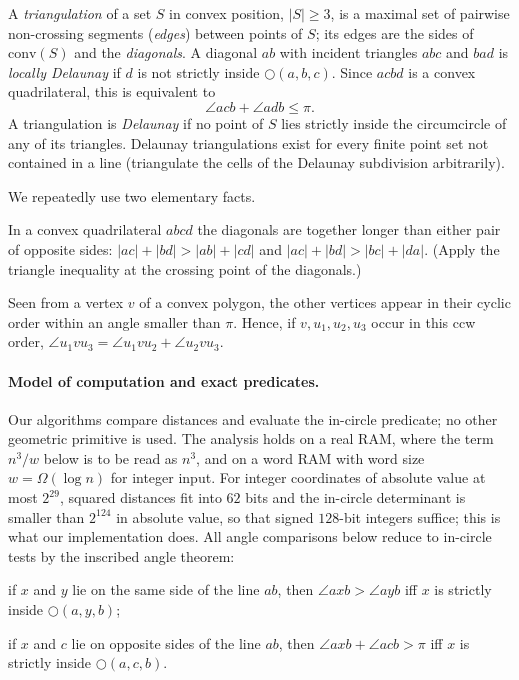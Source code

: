 \documentclass[11pt,a4paper]{article}
\theoremstyle{definition}
\theoremstyle{remark}
\newcommand{\conv}{\mathrm{conv}}
\newcommand{\ang}{\angle}
\newcommand{\circlethree}[3]{\bigcirc(#1,#2,#3)}
\begin{document}
A \emph{triangulation} of a set $S$ in convex position, $|S|\ge3$, is a
maximal set of pairwise non-crossing segments (\emph{edges}) between points of
$S$; its edges are the sides of $\conv(S)$ and the \emph{diagonals}. A
diagonal $ab$ with incident triangles $abc$ and $bad$ is \emph{locally
Delaunay} if $d$ is not strictly inside $\circlethree abc$. Since $acbd$ is a
convex quadrilateral, this is equivalent to
\begin{equation}\label{eq:ld}
\ang acb+\ang adb\le\pi .
\end{equation}
A triangulation is \emph{Delaunay} if no point of $S$ lies strictly inside the
circumcircle of any of its triangles. Delaunay triangulations exist for every
finite point set not contained in a line (triangulate the cells of the
Delaunay subdivision arbitrarily).

We repeatedly use two elementary facts.
\begin{description}[leftmargin=1.5em,itemsep=1pt]
\item[(Q)] In a convex quadrilateral $abcd$ the diagonals are together longer
than either pair of opposite sides: $|ac|+|bd|>|ab|+|cd|$ and
$|ac|+|bd|>|bc|+|da|$. (Apply the triangle inequality at the crossing point of
the diagonals.)
\item[(A)] Seen from a vertex $v$ of a convex polygon, the other vertices
appear in their cyclic order within an angle smaller than $\pi$. Hence, if
$v,u_1,u_2,u_3$ occur in this ccw order, $\ang u_1vu_3=\ang u_1vu_2+\ang u_2vu_3$.
\end{description}

\paragraph{Model of computation and exact predicates.}
Our algorithms compare distances and evaluate the in-circle predicate; no other
geometric primitive is used. The analysis holds on a real RAM, where the term
$n^3/w$ below is to be read as $n^3$, and on a word RAM with word size
$w=\Omega(\log n)$ for integer input. For integer coordinates of absolute value
at most $2^{29}$, squared distances fit into $62$ bits and the in-circle
determinant is smaller than $2^{124}$ in absolute value, so that signed
$128$-bit integers suffice; this is what our implementation does. All angle
comparisons below reduce to in-circle tests by the inscribed angle theorem:
\begin{description}[leftmargin=1.5em,itemsep=1pt]
\item[(I1)] if $x$ and $y$ lie on the same side of the line $ab$, then
$\ang axb>\ang ayb$ iff $x$ is strictly inside $\circlethree ayb$;
\item[(I2)] if $x$ and $c$ lie on opposite sides of the line $ab$, then
$\ang axb+\ang acb>\pi$ iff $x$ is strictly inside $\circlethree acb$.
\end{description}
\end{document}
